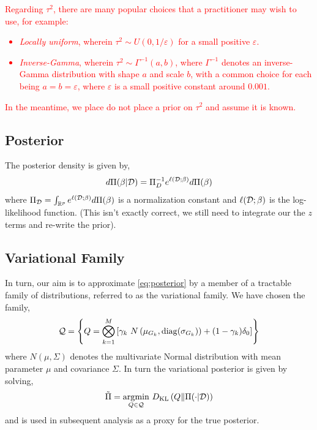 \documentclass[12pt]{article}
\renewcommand{\red}[1]{\textcolor{red}{#1}}
\begin{document}
\red{
Regarding $\tau^2$, there are many popular choices that a practitioner may wish to use, for example:
\begin{itemize}
    \itemsep0em
    \item \textit{Locally uniform}, wherein $\tau^2 \sim U(0, 1/\varepsilon)$ for a small positive $\varepsilon$.
    \item \textit{Inverse-Gamma}, wherein $\tau^2 \sim \Gamma^{-1}(a, b)$, where $\Gamma^{-1}$ denotes an inverse-Gamma distribution with shape $a$ and scale $b$, with a common choice for each being $a=b=\varepsilon$, where $\varepsilon$ is a small positive constant around $0.001$.
\end{itemize}
In the meantime, we place do not place a prior on $\tau^2$ and assume it is known.
}

\subsection{Posterior}

The posterior density is given by,
\begin{equation} \label{eq:posterior} 
d\Pi(\beta | \mathcal{D}) = \Pi_D^{-1} e^{\ell(\mathcal{D}; \beta)} d\Pi(\beta)
\end{equation}
where $\Pi_{\mathcal{D}} = \int_{\mathbb{R}^{p}} e^{\ell(\mathcal{D}; \beta)} d\Pi(\beta)$ is a normalization constant and $\ell(\mathcal{D}; \beta)$ is the log-likelihood function. (This isn't exactly correct, we still need to integrate our the $z$ terms and re-write the prior).


\subsection{Variational Family}

In turn, our aim is to approximate \eqref{eq:posterior} by a member of a tractable family of distributions, referred to as the variational family. We have chosen the family,
\begin{equation}
    \mathcal{Q} = \left\{ Q =  \bigotimes_{k=1}^M \left[ 
    \gamma_k\ N\left(\mu_{G_k}, \operatorname{diag}( \sigma_{G_k}) \right) + (1-\gamma_k) \delta_0
\right] \right\}
\end{equation}
where $N(\mu, \Sigma)$ denotes the multivariate Normal distribution with mean parameter $\mu$ and covariance $\Sigma$. In turn the variational posterior is given by solving,
\begin{equation} \label{eq:optim} 
\tilde{\Pi} = \underset{Q \in \mathcal{Q}}{{\arg\!\min}}\ D_\text{KL}\left( Q \| \Pi(\cdot |\mathcal{D}) \right)
\end{equation}
and is used in subsequent analysis as a proxy for the true posterior.
\end{document}
